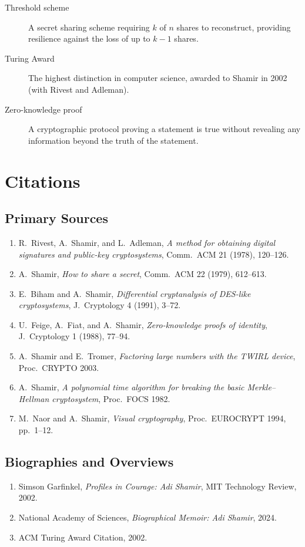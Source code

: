 \begin{description}
    \item[Threshold scheme] A secret sharing scheme requiring $k$ of $n$ shares to reconstruct, providing resilience against the loss of up to $k-1$ shares.
    \item[Turing Award] The highest distinction in computer science, awarded to Shamir in 2002 (with Rivest and Adleman).
    \item[Zero-knowledge proof] A cryptographic protocol proving a statement is true without revealing any information beyond the truth of the statement.
\end{description}

\section{Citations}
\subsection*{Primary Sources}
\begin{enumerate}
    \item R.\ Rivest, A.\ Shamir, and L.\ Adleman, \textit{A method for obtaining digital signatures and public-key cryptosystems}, Comm.\ ACM 21 (1978), 120--126.
    \item A.\ Shamir, \textit{How to share a secret}, Comm.\ ACM 22 (1979), 612--613.
    \item E.\ Biham and A.\ Shamir, \textit{Differential cryptanalysis of DES-like cryptosystems}, J.\ Cryptology 4 (1991), 3--72.
    \item U.\ Feige, A.\ Fiat, and A.\ Shamir, \textit{Zero-knowledge proofs of identity}, J.\ Cryptology 1 (1988), 77--94.
    \item A.\ Shamir and E.\ Tromer, \textit{Factoring large numbers with the TWIRL device}, Proc.\ CRYPTO 2003.
    \item A.\ Shamir, \textit{A polynomial time algorithm for breaking the basic Merkle--Hellman cryptosystem}, Proc.\ FOCS 1982.
    \item M.\ Naor and A.\ Shamir, \textit{Visual cryptography}, Proc.\ EUROCRYPT 1994, pp.\ 1--12.
\end{enumerate}

\subsection*{Biographies and Overviews}
\begin{enumerate}
    \item Simson Garfinkel, \textit{Profiles in Courage: Adi Shamir}, MIT Technology Review, 2002.
    \item National Academy of Sciences, \textit{Biographical Memoir: Adi Shamir}, 2024.
    \item ACM Turing Award Citation, 2002.
\end{enumerate}

